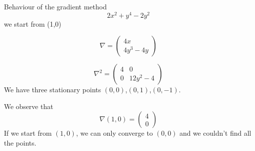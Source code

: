 \begin{example}\begin{leftbar} Behaviour of the gradient method
$$2x^{2}+y^{4}-2y^{2}$$
we start from (1,0)

 \begin{equation*}
   \nabla=
 \begin{pmatrix}
4x  \\
4y^{3}-4y
\end{pmatrix}
\end{equation*}

\begin{equation*}
   \nabla^{2}=
 \begin{pmatrix}
4 & 0 \\
0 & 12y^{2}-4
\end{pmatrix}
\end{equation*}
We have three stationary points $(0,0)$,$(0,1)$,$(0,-1)$. 

We observe that
 \begin{equation*}
   \nabla(1,0)=
 \begin{pmatrix}
4  \\
0
\end{pmatrix}
\end{equation*}
If we start from $(1,0)$, we can only converge to $(0,0)$ and we couldn't find all the points. 
\end{leftbar}\end{example}








%